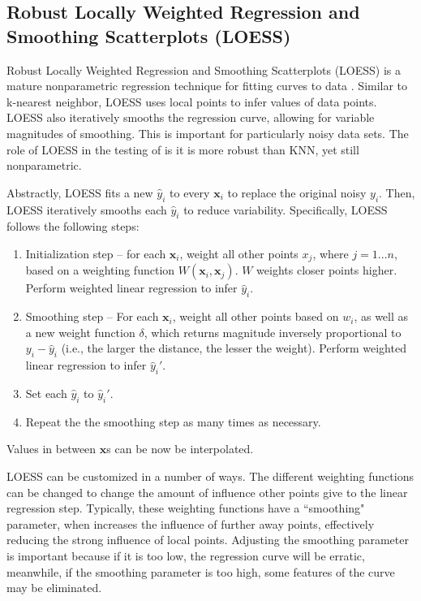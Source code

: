 \subsection{Robust Locally Weighted Regression and Smoothing Scatterplots (LOESS)}


Robust Locally Weighted Regression and Smoothing Scatterplots (LOESS) is a mature nonparametric regression technique for fitting curves to data   \cite{cleveland1979robust}\cite{cleveland1988locally}.
Similar to k-nearest neighbor, LOESS uses local points to infer values of data points.
LOESS also iteratively smooths the regression curve, allowing for variable magnitudes of smoothing.
This is important for particularly noisy data sets.
The role of LOESS in the testing of \fw is it is more robust than KNN, yet still nonparametric.

Abstractly, LOESS fits a new $\hat y_i$ to every $\mathbf x_i$ to replace the original noisy $y_i$.
Then, LOESS iteratively smooths each $\hat y_i$ to reduce variability.
Specifically, LOESS follows the following steps:
\begin{enumerate}
   \item Initialization step -- for each $\mathbf x_i$, weight all other points $x_j$, where $j = 1...n$, based on a weighting function $W(\mathbf x_i, \mathbf x_j)$. $W$ weights closer points higher. Perform weighted linear regression to infer $\hat y_i$.
   \item Smoothing step -- For each $\mathbf x_i$, weight all other points based on $w_i$, as well as a new weight function $\delta$, which returns magnitude inversely proportional to $y_i - \hat y_i$ (i.e., the larger the distance, the lesser the weight). Perform weighted linear regression to infer $\hat y_i'$.
   \item Set each $\hat y_i$ to $\hat y_i'$.
   \item Repeat the the smoothing step as many times as necessary.
\end{enumerate}
Values in between $\mathbf x$s can be now be interpolated.

LOESS can be customized in a number of ways.
The different weighting functions can be changed to change the amount of influence other points give to the linear regression step.
Typically, these weighting functions have a ``smoothing" parameter, when increases the influence of further away points, effectively reducing the strong influence of local points.
Adjusting the smoothing parameter is important because if it is too low, the regression curve will be erratic, meanwhile, if the smoothing parameter is too high, some features of the curve may be eliminated.

